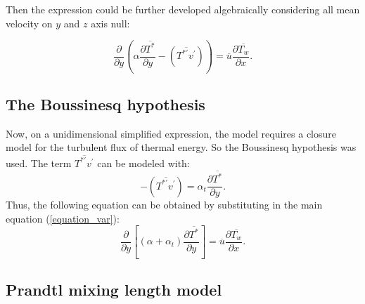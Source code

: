 \documentclass[10pt]{article} %
\begin{document}
Then the expression could be further developed algebraically considering all mean velocity on $y$ and $z$ axis null:

\begin{equation}\label{equation_var}
{\frac{\partial{}}{\partial{y}}} \left(\alpha {\frac{\partial{\overline{T^\ast}}}{\partial{y}}}   
- \left(\overline{ T^{\ast\prime} v^\prime}\right) \right)
= 
\overline{u}\frac{\partial{\overline{T_w}}}{\partial{x}}.
\end{equation}



\subsection{The Boussinesq hypothesis}

Now, on a unidimensional simplified expression, the model requires a closure model for the turbulent flux of thermal energy. 
So the Boussinesq hypothesis was used. The term $\overline{T^{\ast\prime}  v^\prime}$ can be modeled with:
\begin{equation}\label{bou}
-\left(\overline{ T^{\ast\prime}  v^\prime}\right) = 
\alpha_t \frac{\partial{\overline{T^\ast}}}{\partial{y}}.
\end{equation}
Thus, the following equation can be obtained by substituting in the main equation (\ref{equation_var}):
\\
\begin{equation}
{\frac{\partial{}}{\partial{y}}} \left[(\alpha + \alpha_t)  \frac{\partial \overline{T^\ast}}{\partial y} \right]
= 
\overline{u}\frac{\partial{\overline{T_w}}}{\partial{x}}. 
\end{equation}

\subsection{Prandtl mixing length model} 
\end{document}
